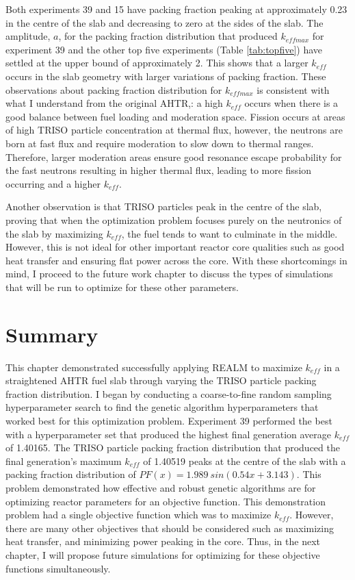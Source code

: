 Both experiments 39 and 15 have packing fraction peaking at approximately 
0.23 in the centre of the slab and decreasing to zero at the sides of the slab.  
The amplitude, $a$, for the packing fraction distribution that produced $k_{eff max}$ 
for experiment 39 and the other top five experiments (Table \ref{tab:topfive}) 
have settled at the upper bound of approximately 2. 
This shows that a larger $k_{eff}$ occurs in the slab geometry with larger 
variations of packing fraction. 
These observations about packing fraction distribution for $k_{eff max}$ is 
consistent with what I understand from the original \gls{AHTR},: a high $k_{eff}$ 
occurs when there is a good balance between fuel loading and moderation space. 
Fission occurs at areas of high \gls{TRISO} particle concentration at thermal flux, 
however, the neutrons are born at fast flux and require moderation to slow down 
to thermal ranges.
Therefore, larger moderation areas ensure good resonance escape probability for 
the fast neutrons resulting in higher thermal flux, leading to more 
fission occurring and a higher $k_{eff}$. 

Another observation is that TRISO particles peak in the centre of the slab, 
proving that when the optimization problem focuses purely on the neutronics 
of the slab by maximizing $k_{eff}$, the fuel tends to want to culminate in the 
middle. 
However, this is not ideal for other important reactor core qualities such as 
good heat transfer and ensuring flat power across the core. 
With these shortcomings in mind, I proceed to the future work chapter to discuss 
the types of simulations that will be run to optimize for these other parameters. 



\section{Summary}
This chapter demonstrated successfully applying \gls{REALM} to maximize $k_{eff}$ 
in a straightened \acrfull{AHTR} fuel slab through varying the \gls{TRISO} 
particle packing fraction distribution. 
I began by conducting a coarse-to-fine random sampling hyperparameter search to 
find the genetic algorithm hyperparameters that worked best for this optimization 
problem.
Experiment 39 performed the best with a hyperparameter set that produced the 
highest final generation average $k_{eff}$ of 1.40165. 
The \gls{TRISO} particle packing fraction distribution that produced the final 
generation's maximum $k_{eff}$ of 1.40519 peaks at the centre of the slab with 
a packing fraction distribution of $PF(x)=1.989\ sin(0.54x+3.143)$. 
This problem demonstrated how effective and robust genetic algorithms are for 
optimizing reactor parameters for an objective function. 
This demonstration problem had a single objective function which was to maximize 
$k_{eff}$. 
However, there are many other objectives that should be considered such as 
maximizing heat transfer, and minimizing power peaking in the core. 
Thus, in the next chapter, I will propose future simulations for optimizing
for these objective functions simultaneously.
